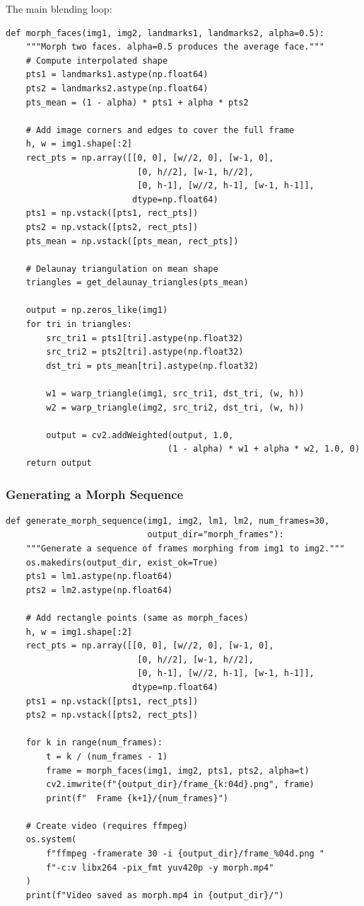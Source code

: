 The main blending loop:

\begin{verbatim}
def morph_faces(img1, img2, landmarks1, landmarks2, alpha=0.5):
    """Morph two faces. alpha=0.5 produces the average face."""
    # Compute interpolated shape
    pts1 = landmarks1.astype(np.float64)
    pts2 = landmarks2.astype(np.float64)
    pts_mean = (1 - alpha) * pts1 + alpha * pts2

    # Add image corners and edges to cover the full frame
    h, w = img1.shape[:2]
    rect_pts = np.array([[0, 0], [w//2, 0], [w-1, 0],
                          [0, h//2], [w-1, h//2],
                          [0, h-1], [w//2, h-1], [w-1, h-1]],
                         dtype=np.float64)
    pts1 = np.vstack([pts1, rect_pts])
    pts2 = np.vstack([pts2, rect_pts])
    pts_mean = np.vstack([pts_mean, rect_pts])

    # Delaunay triangulation on mean shape
    triangles = get_delaunay_triangles(pts_mean)

    output = np.zeros_like(img1)
    for tri in triangles:
        src_tri1 = pts1[tri].astype(np.float32)
        src_tri2 = pts2[tri].astype(np.float32)
        dst_tri = pts_mean[tri].astype(np.float32)

        w1 = warp_triangle(img1, src_tri1, dst_tri, (w, h))
        w2 = warp_triangle(img2, src_tri2, dst_tri, (w, h))

        output = cv2.addWeighted(output, 1.0,
                                (1 - alpha) * w1 + alpha * w2, 1.0, 0)
    return output
\end{verbatim}

\subsubsection*{Generating a Morph Sequence}

\begin{verbatim}
def generate_morph_sequence(img1, img2, lm1, lm2, num_frames=30,
                            output_dir="morph_frames"):
    """Generate a sequence of frames morphing from img1 to img2."""
    os.makedirs(output_dir, exist_ok=True)
    pts1 = lm1.astype(np.float64)
    pts2 = lm2.astype(np.float64)

    # Add rectangle points (same as morph_faces)
    h, w = img1.shape[:2]
    rect_pts = np.array([[0, 0], [w//2, 0], [w-1, 0],
                          [0, h//2], [w-1, h//2],
                          [0, h-1], [w//2, h-1], [w-1, h-1]],
                         dtype=np.float64)
    pts1 = np.vstack([pts1, rect_pts])
    pts2 = np.vstack([pts2, rect_pts])

    for k in range(num_frames):
        t = k / (num_frames - 1)
        frame = morph_faces(img1, img2, pts1, pts2, alpha=t)
        cv2.imwrite(f"{output_dir}/frame_{k:04d}.png", frame)
        print(f"  Frame {k+1}/{num_frames}")

    # Create video (requires ffmpeg)
    os.system(
        f"ffmpeg -framerate 30 -i {output_dir}/frame_%04d.png "
        f"-c:v libx264 -pix_fmt yuv420p -y morph.mp4"
    )
    print(f"Video saved as morph.mp4 in {output_dir}/")
\end{verbatim}


